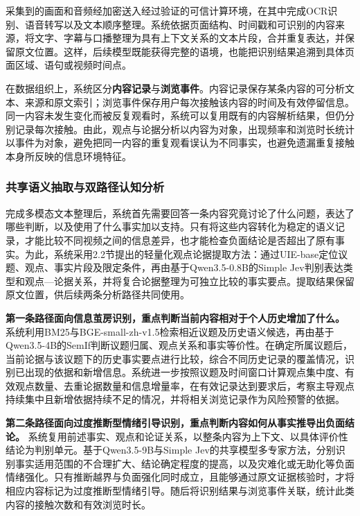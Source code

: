 采集到的画面和音频经加密送入经过验证的可信计算环境，在其中完成OCR识别、语音转写以及文本顺序整理。系统依据页面结构、时间戳和可识别的内容来源，将文字、字幕与口播整理为具有上下文关系的文本片段，合并重复表达，并保留原文位置。这样，后续模型既能获得完整的语境，也能把识别结果追溯到具体页面区域、语句或视频时间点。

在数据组织上，系统区分\textbf{内容记录}与\textbf{浏览事件}。内容记录保存某条内容的可分析文本、来源和原文索引；浏览事件保存用户每次接触该内容的时间及有效停留信息。同一内容未发生变化而被反复观看时，系统可以复用既有的内容解析结果，但仍分别记录每次接触。由此，观点与论据分析以内容为对象，出现频率和浏览时长统计以事件为对象，避免把同一内容的重复观看误认为不同事实，也避免遗漏重复接触本身所反映的信息环境特征。

\subsubsection{共享语义抽取与双路径认知分析}\label{section:2.1.3}

完成多模态文本整理后，系统首先需要回答一条内容究竟讨论了什么问题，表达了哪些判断，以及使用了什么事实加以支持。只有将这些内容转化为稳定的语义记录，才能比较不同视频之间的信息差异，也才能检查负面结论是否超出了原有事实。为此，系统采用2.2节提出的轻量化观点论据提取方法：通过UIE-base定位议题、观点、事实片段及限定条件，再由基于Qwen3.5-0.8B的Simple Jev判别表达类型和观点---论据关系，并将复合论据整理为可独立比较的事实要点。提取结果保留原文位置，供后续两条分析路径共同使用。

\textbf{第一条路径面向信息茧房识别，重点判断当前内容相对于个人历史增加了什么。} 系统利用BM25与BGE-small-zh-v1.5检索相近议题及历史语义候选，再由基于Qwen3.5-4B的SemIf判断议题归属、观点关系和事实等价性。在确定所属议题后，当前论据与该议题下的历史事实要点进行比较，综合不同历史记录的覆盖情况，识别已出现的依据和新增信息。系统进一步按照议题及时间窗口计算观点集中度、有效观点数量、去重论据数量和信息增量率，在有效记录达到要求后，考察主导观点持续集中且新增依据持续不足的情况，并将相关浏览记录作为风险预警的依据。

\textbf{第二条路径面向过度推断型情绪引导识别，重点判断内容如何从事实推导出负面结论。} 系统复用前述事实、观点和论证关系，以整条内容为上下文、以具体评价性结论为判别单元。基于Qwen3.5-9B与Simple Jev的共享模型多专家方法，分别识别事实适用范围的不合理扩大、结论确定程度的提高，以及灾难化或无助化等负面情绪强化。只有推断越界与负面强化同时成立，且能够通过原文证据核验时，才将相应内容标记为过度推断型情绪引导。随后将识别结果与浏览事件关联，统计此类内容的接触次数和有效浏览时长。


